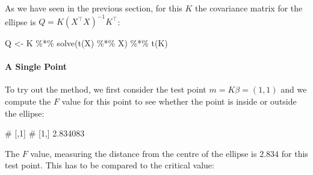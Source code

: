 \documentclass[
  a4paper,
]{article}
\newenvironment{Shaded}{\begin{snugshade}}{\end{snugshade}}
\newcommand{\DecValTok}[1]{\textcolor[rgb]{0.00,0.00,0.81}{#1}}
\newcommand{\FunctionTok}[1]{\textcolor[rgb]{0.00,0.00,0.00}{#1}}
\newcommand{\NormalTok}[1]{#1}
\newcommand{\OtherTok}[1]{\textcolor[rgb]{0.56,0.35,0.01}{#1}}
\newcommand{\SpecialCharTok}[1]{\textcolor[rgb]{0.00,0.00,0.00}{#1}}
\theoremstyle{definition}
\theoremstyle{definition}
\theoremstyle{definition}
\theoremstyle{definition}
\theoremstyle{remark}
\begin{document}
As we have seen in the previous section, for this \(K\) the covariance matrix for
the ellipse is \(Q = K (X^\top X)^{-1} K^\top\):

\begin{Shaded}
\begin{Highlighting}[]
\NormalTok{Q }\OtherTok{\textless{}{-}}\NormalTok{ K }\SpecialCharTok{\%*\%} \FunctionTok{solve}\NormalTok{(}\FunctionTok{t}\NormalTok{(X) }\SpecialCharTok{\%*\%}\NormalTok{ X) }\SpecialCharTok{\%*\%} \FunctionTok{t}\NormalTok{(K)}
\end{Highlighting}
\end{Shaded}

\hypertarget{a-single-point}{%
\paragraph{A Single Point}\label{a-single-point}}

To try out the method, we first consider the test point \(m = K\beta = (1, 1)\)
and we compute the \(F\) value for this point to see whether the point is
inside or outside the ellipse:

\begin{Shaded}
\end{Shaded}

\begin{Shaded}
\begin{Highlighting}[]
\NormalTok{\#          [,1]}
\NormalTok{\# [1,] 2.834083}
\end{Highlighting}
\end{Shaded}

The \(F\) value, measuring the distance from the centre of the ellipse
is \(2.834\) for this test point. This has to be compared to the
critical value:
\end{document}
